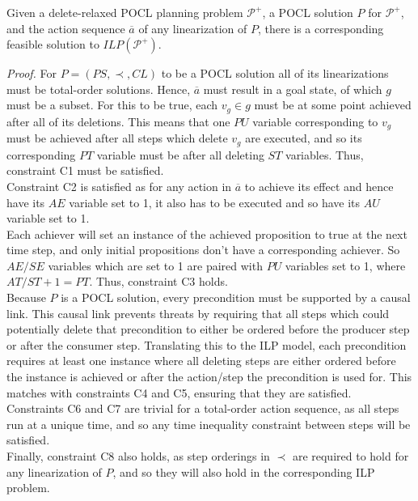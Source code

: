 \begin{thm}
Given a delete-relaxed POCL planning problem $\mathcal{P}^+$, a POCL solution $P$ for $\mathcal{P}^+$, and the action sequence $\overline{a}$ of any linearization of $P$, there is a corresponding feasible solution to $\mathit{ILP}(\mathcal{P}^+)$.
\end{thm}
\textit{Proof.} For $P=(PS,\prec , CL)$ to be a POCL solution all of its linearizations must be total-order solutions. Hence, $\overline{a}$ must result in a goal state, of which $g$ must be a subset. For this to be true, each $v_g\in g$ must be at some point achieved after all of its deletions. This means that one $PU$ variable corresponding to $v_g$ must be achieved after all steps which delete $v_g$ are executed, and so its corresponding $PT$ variable must be after all deleting $ST$ variables. Thus, constraint C1 must be satisfied.\\


Constraint C2 is satisfied as for any action in $\overline{a}$ to achieve its effect and hence have its $AE$ variable set to 1, it also has to be executed and so have its $AU$ variable set to 1.\\


Each achiever will set an instance of the achieved proposition to true at the next time step, and only initial propositions don't have a corresponding achiever. So $AE/SE$ variables which are set to 1 are paired with $PU$ variables set to 1, where $AT/ST + 1 = PT$. Thus, constraint C3 holds.\\


Because $P$ is a POCL solution, every precondition must be supported by a causal link. This causal link prevents threats by requiring that all steps which could potentially delete that precondition to either be ordered before the producer step or after the consumer step. Translating this to the ILP model, each precondition requires at least one instance where all deleting steps are either ordered before the instance is achieved or after the action/step the precondition is used for. This matches with constraints C4 and C5, ensuring that they are satisfied.\\


Constraints C6 and C7 are trivial for a total-order action sequence, as all steps run at a unique time, and so any time inequality constraint between steps will be satisfied.\\


Finally, constraint C8 also holds, as step orderings in $\prec$ are required to hold for any linearization of $P$, and so they will also hold in the corresponding ILP problem.\\


